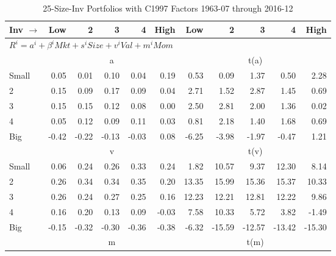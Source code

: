 
\begin{table}[!ht]
\centering
\caption{25-Size-Inv Portfolios with C1997 Factors 1963-07 through 2016-12}
\begin{tabular}{lrrrrrrrrrr}
  \toprule
    Inv $\rightarrow$ & Low & 2 & 3 & 4 & High & Low & 2 & 3 & 4 & High \\ 
  \midrule
  \multicolumn{11}{l}{$R^i=a^i+\beta^iMkt+s^iSize+v^iVal+m^iMom$} \\

  
    
      & \multicolumn{5}{c}{a} & \multicolumn{5}{c}{t(a)}
    
    \\
      \cmidrule(r){2-6} \cmidrule(r){7-11}

    Small   & 0.05  & 0.01  & 0.10  & 0.04  & 0.19  & 0.53  & 0.09  & 1.37  & 0.50  & 2.28  \\
         2  & 0.15  & 0.09  & 0.17  & 0.09  & 0.04  & 2.71  & 1.52  & 2.87  & 1.45  & 0.69  \\
         3  & 0.15  & 0.15  & 0.12  & 0.08  & 0.00  & 2.50  & 2.81  & 2.00  & 1.36  & 0.02  \\
         4  & 0.05  & 0.12  & 0.09  & 0.11  & 0.03  & 0.81  & 2.18  & 1.40  & 1.68  & 0.69  \\
    Big     & -0.42  & -0.22  & -0.13  & -0.03  & 0.08  & -6.25  & -3.98  & -1.97  & -0.47  & 1.21  \\

  
    
      & \multicolumn{5}{c}{v} & \multicolumn{5}{c}{t(v)}
    
    \\
      \cmidrule(r){2-6} \cmidrule(r){7-11}

    Small   & 0.06  & 0.24  & 0.26  & 0.33  & 0.24  & 1.82  & 10.57  & 9.37  & 12.30  & 8.14  \\
         2  & 0.26  & 0.34  & 0.34  & 0.35  & 0.20  & 13.35  & 15.99  & 15.36  & 15.37  & 10.33  \\
         3  & 0.26  & 0.24  & 0.27  & 0.25  & 0.16  & 12.23  & 12.21  & 12.81  & 12.22  & 9.86  \\
         4  & 0.16  & 0.20  & 0.13  & 0.09  & -0.03  & 7.58  & 10.33  & 5.72  & 3.82  & -1.49  \\
    Big     & -0.15  & -0.32  & -0.30  & -0.36  & -0.38  & -6.32  & -15.59  & -12.57  & -13.42  & -15.30  \\

  
    
      & \multicolumn{5}{c}{m} & \multicolumn{5}{c}{t(m)}
    

\end{tabular}
\end{table}
